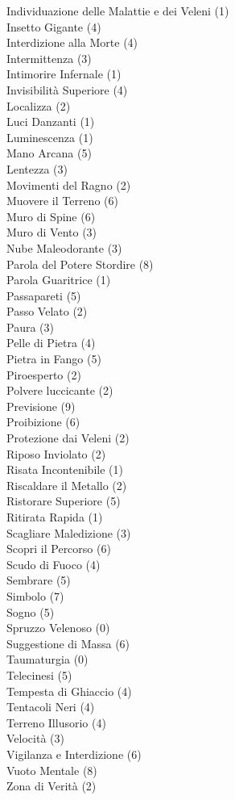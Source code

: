 \begin{multicols}{3}
{	Individuazione delle Malattie e dei Veleni (1)\\
	Insetto Gigante (4)\\
	Interdizione alla Morte (4)\\
	Intermittenza (3)\\
	Intimorire Infernale (1)\\
	Invisibilità Superiore (4)\\
	Localizza (2)\\
	Luci Danzanti (1)\\
	Luminescenza (1)\\
	Mano Arcana (5)\\
	Lentezza (3)\\
	Movimenti del Ragno (2)\\
	Muovere il Terreno (6)\\
	Muro di Spine (6)\\
	Muro di Vento (3)\\
	Nube Maleodorante (3)\\
	Parola del Potere Stordire (8)\\
	Parola Guaritrice (1)\\
	Passapareti (5)\\
	Passo Velato (2)\\
	Paura (3)\\
	Pelle di Pietra (4)\\
	Pietra in Fango (5)\\
	Piroesperto (2)\\
	Polvere luccicante (2)\\
	Previsione (9)\\
	Proibizione (6)\\
	Protezione dai Veleni (2)\\
	Riposo Inviolato (2)\\
	Risata Incontenibile (1)\\
	Riscaldare il Metallo (2)\\
	Ristorare Superiore (5)\\
	Ritirata Rapida (1)\\
	Scagliare Maledizione (3)\\
	Scopri il Percorso (6)\\
	Scudo di Fuoco (4)\\
	Sembrare (5)\\
	Simbolo (7)\\
	Sogno (5)\\
	Spruzzo Velenoso (0)\\
	Suggestione di Massa (6)\\
	Taumaturgia (0)\\
	Telecinesi (5)\\
	Tempesta di Ghiaccio (4)\\
	Tentacoli Neri (4)\\
	Terreno Illusorio (4)\\
	Velocità (3)\\
	Vigilanza e Interdizione (6)\\
	Vuoto Mentale (8)\\
	Zona di Verità (2)\\

}
\end{multicols}
